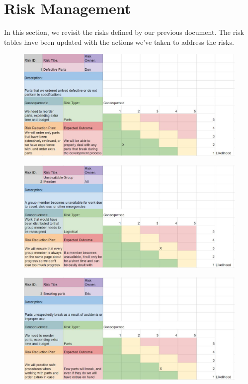 
\section{Risk Management}
\label{sec:risk_management}


In this section, we revisit the risks defined by our previous document. The risk tables have been updated with the actions we've taken to address the risks.\

\begin{figure}[h!]
\centering
\includegraphics[width=0.98\columnwidth]{risks/risk1.JPG}
\label{fig:risk1}
\end{figure}

\begin{figure}[h!]
\centering
\includegraphics[width=0.98\columnwidth]{risks/risk2.JPG}
\label{fig:risk2}
\end{figure}

\begin{figure}[h!]
\centering
\includegraphics[width=0.98\columnwidth]{risks/risk3.JPG}
\label{fig:risk3}
\end{figure}


